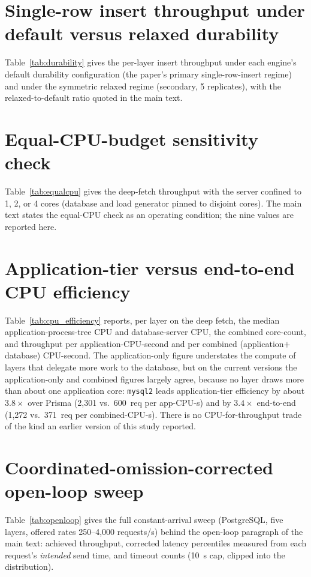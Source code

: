 \documentclass[11pt,a4paper]{article}
\newcommand{\tabledir}{tables/}
\begin{document}


\section{Single-row insert throughput under default versus relaxed durability}
\label{sup:durability}
Table~\ref{tab:durability} gives the per-layer insert throughput under each
engine's default durability configuration (the paper's primary single-row-insert regime)
and under the symmetric relaxed regime (secondary, 5 replicates), with the
relaxed-to-default ratio quoted in the main text.



\section{Equal-CPU-budget sensitivity check}
\label{sup:equalcpu}
Table~\ref{tab:equalcpu} gives the deep-fetch throughput with the server
confined to 1, 2, or 4 cores (database and load generator pinned to disjoint
cores). The main text states the equal-CPU check as an operating condition; the nine values are
reported here.



\section{Application-tier versus end-to-end CPU efficiency}
\label{sup:cpu}
Table~\ref{tab:cpu_efficiency} reports, per layer on the deep fetch,
the median application-process-tree CPU and database-server CPU, the combined
core-count, and throughput per application-CPU-second and per combined
(application$+$database) CPU-second. The application-only figure understates the
compute of layers that delegate more work to the database, but on the current
versions the application-only and combined figures largely agree, because no
layer draws more than about one application core: \texttt{mysql2} leads
application-tier efficiency by about $3.8\times$ over Prisma (2{,}301 vs.\
600~req per app-CPU-s) and by $3.4\times$ end-to-end (1{,}272 vs.\ 371~req per
combined-CPU-s). There is no CPU-for-throughput trade of the kind an earlier
version of this study reported.



\section{Coordinated-omission-corrected open-loop sweep}
\label{sup:openloop}
Table~\ref{tab:openloop} gives the full constant-arrival sweep (PostgreSQL,
five layers, offered rates 250--4{,}000 requests/s) behind the open-loop
paragraph of the main text: achieved throughput, corrected latency
percentiles measured from each request's \emph{intended} send time, and
timeout counts (10~s cap, clipped into the distribution).
\end{document}
